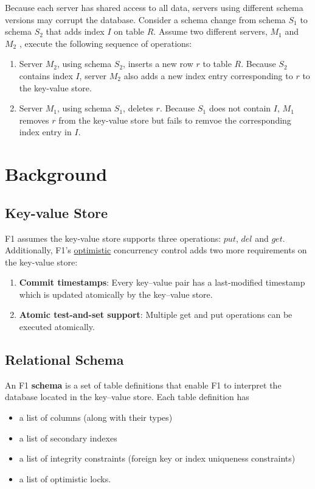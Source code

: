 \documentclass[11pt]{article}
\begin{document}
Because each server has shared access to all data, servers using different schema versions may corrupt
the database. Consider a schema change from schema \(S_1\) to schema \(S_2\) that adds index \(I\) on
table \(R\). Assume two different servers, \(M_1\) and \(M_2\) , execute the following sequence of
operations:
\begin{enumerate}
\item Server \(M_2\), using schema \(S_2\), inserts a new row \(r\) to table \(R\). Because \(S_2\)
contains index \(I\), server \(M_2\) also adds a new index entry corresponding to \(r\) to the
key-value store.
\item Server \(M_1\), using schema \(S_1\), deletes \(r\). Because \(S_1\) does not contain \(I\),
\(M_1\) removes \(r\) from the key-value store but fails to remvoe the corresponding index entry in
\(I\).
\end{enumerate}
\section{Background}
\label{sec:orgc851acb}
\subsection{Key-value Store}
\label{sec:orgd740840}
F1 assumes the key-value store supports three operations: \(put\), \(del\) and \(get\). Additionally,
F1's \uline{optimistic} concurrency control adds two more requirements on the key-value store:
\begin{enumerate}
\item \textbf{Commit timestamps}: Every key–value pair has a last-modified timestamp which is updated atomically by the key–value store.
\item \textbf{Atomic test-and-set support}: Multiple get and put operations can be executed atomically.
\end{enumerate}
\subsection{Relational Schema}
\label{sec:org0795fcc}
An F1 \textbf{schema} is a set of table definitions that enable F1 to interpret the database located in the
key–value store. Each table definition has
\begin{itemize}
\item a list of columns (along with their types)
\item a list of secondary indexes
\item a list of integrity constraints (foreign key or index uniqueness constraints)
\item a list of optimistic locks.
\end{itemize}
\end{document}
